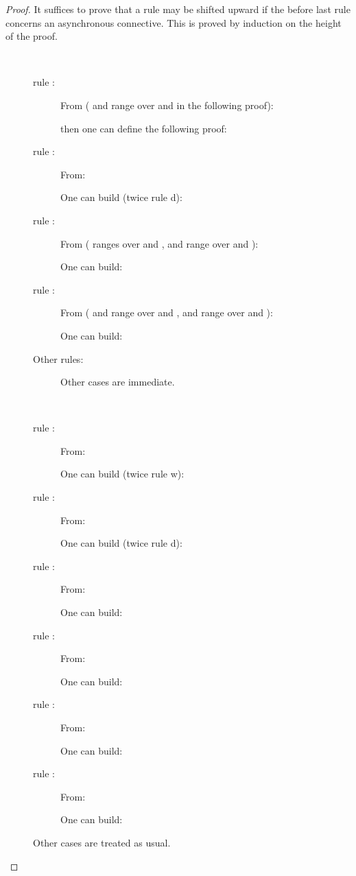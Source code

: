 \documentclass{llncs}
\begin{document}
\begin{proof}
It suffices to prove that a rule may be shifted upward if the before last rule
concerns an asynchronous connective. This is proved by induction on the 
height of the proof.

\begin{description}
\item[] \ \\
     \begin{description}
     \item[rule : ] From ( and  range over  and  in the following proof):
          
          then one can define the following proof:
          
     \item[rule : ] From:
          
          One can build (twice rule d):
                  
     \item[rule : ] From ( ranges over  and ,
 and  range over  and ):
          
          One can build:
          
     \item[rule : ] From ( and  range over  and ,  and  range 
     over  and ):
          
          One can build:
                
     \item[Other rules: ] Other cases are immediate.
     \end{description}
\item[] \ \\
     \begin{description}
     \item[rule : ] From:
          
          One can build (twice rule w):
          
     \item[rule : ] From:
          
          One can build (twice rule d):
          
     \item[rule : ] From:
              
          One can build:
          
      \item[rule : ] From:
          
         One can build:
         
      \item[rule : ] From:
         
         One can build:
         
      \item[rule : ] From:
         
         One can build:
         
      \end{description}
\item[] Other cases are treated as usual.
\end{description}

\end{proof}
\end{document}
